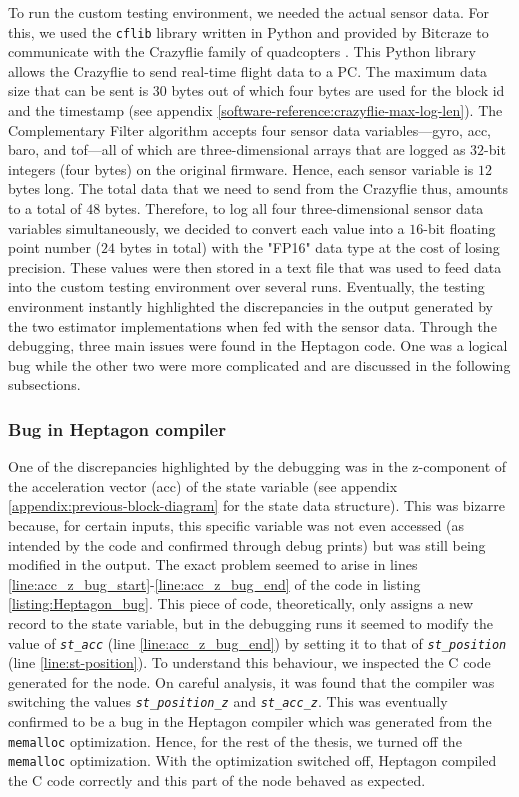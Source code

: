\documentclass[10pt, a4paper]{article}
\newcommand{\textFunc}[1]{\texttt{\textit{#1}}}
\newcommand{\code}[1]{\texttt{#1}}
\begin{document}
    To run the custom testing environment, we needed the actual sensor data. For this, we used the \code{cflib} library written in Python and provided by Bitcraze to communicate with the Crazyflie family of quadcopters \cite{software:crazyflie-clients-python}. This Python library allows the Crazyflie to send real-time flight data to a PC. The maximum data size that can be sent is $30$ bytes out of which four bytes are used for the block id and the timestamp (see appendix \ref{software-reference:crazyflie-max-log-len}). The Complementary Filter algorithm accepts four sensor data variables---gyro, acc, baro, and tof---all of which are three-dimensional arrays that are logged as $32$-bit integers (four bytes) on the original firmware. Hence, each sensor variable is $12$ bytes long. The total data that we need to send from the Crazyflie thus, amounts to a total of $48$ bytes. Therefore, to log all four three-dimensional sensor data variables simultaneously, we decided to convert each value into a $16$-bit floating point number ($24$ bytes in total) with the "FP16" data type \cite{software:crazyflie-FP16} at the cost of losing precision. These values were then stored in a text file that was used to feed data into the custom testing environment over several runs. Eventually, the testing environment instantly highlighted the discrepancies in the output generated by the two estimator implementations when fed with the sensor data. Through the debugging, three main issues were found in the Heptagon code. One was a logical bug while the other two were more complicated and are discussed in the following subsections.

    \subsubsection{Bug in Heptagon compiler}
    \label{section:bug-in-compiler}
    One of the discrepancies highlighted by the debugging was in the z-component of the acceleration vector (acc) of the state variable (see appendix \ref{appendix:previous-block-diagram} for the state data structure). This was bizarre because, for certain inputs, this specific variable was not even accessed (as intended by the code and confirmed through debug prints) but was still being modified in the output. The exact problem seemed to arise in lines \ref{line:acc_z_bug_start}-\ref{line:acc_z_bug_end} of the code in listing \ref{listing:Heptagon_bug}. This piece of code, theoretically, only assigns a new record to the state variable, but in the debugging runs it seemed to modify the value of \textFunc{st\_acc} (line \ref{line:acc_z_bug_end}) by setting it to that of \textFunc{st\_position} (line \ref{line:st-position}). To understand this behaviour, we inspected the C code generated for the node. On careful analysis, it was found that the compiler was switching the values \textFunc{st\_position\_z} and \textFunc{st\_acc\_z}. This was eventually confirmed to be a bug in the Heptagon compiler \cite{software:heptagon-issue} which was generated from the \code{memalloc} optimization. Hence, for the rest of the thesis, we turned off the \code{memalloc} optimization. With the optimization switched off, Heptagon compiled the C code correctly and this part of the node behaved as expected.
\end{document}
